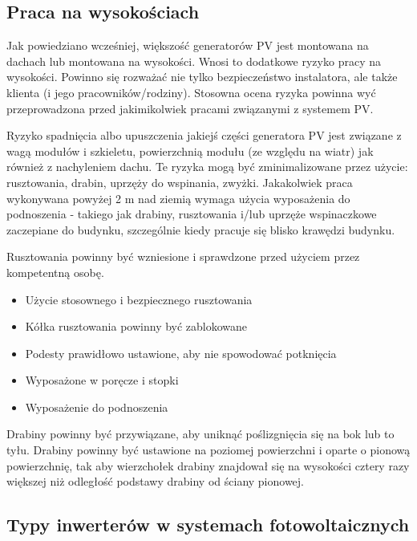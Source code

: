 \documentclass[12pt,a4paper]{article}
\begin{document}
 

\subsection{Praca na wysokościach }


Jak powiedziano wcześniej, większość generatorów PV jest montowana na 
dachach lub montowana na wysokości. Wnosi to dodatkowe ryzyko pracy na 
wysokości. Powinno się rozważać nie tylko bezpieczeństwo instalatora, 
ale także klienta (i jego pracowników/rodziny). Stosowna ocena ryzyka 
powinna wyć przeprowadzona przed jakimikolwiek pracami związanymi z 
systemem PV. 

 

Ryzyko spadnięcia albo upuszczenia jakiejś części generatora PV jest 
związane z wagą modułów i szkieletu, powierzchnią modułu (ze względu na 
wiatr) jak również z nachyleniem dachu. Te ryzyka mogą być 
zminimalizowane przez użycie: rusztowania, drabin, uprzęży do wspinania, 
zwyżki. Jakakolwiek praca wykonywana powyżej 2 m nad ziemią wymaga 
użycia wyposażenia do podnoszenia - takiego jak drabiny, rusztowania 
i/lub uprzęże wspinaczkowe zaczepiane do budynku, szczególnie kiedy 
pracuje się blisko krawędzi budynku. 

 

Rusztowania powinny być wzniesione i sprawdzone przed użyciem przez 
kompetentną osobę. 

\begin{itemize}
\item Użycie stosownego i bezpiecznego rusztowania 
\item Kółka rusztowania powinny być zablokowane 
\item Podesty prawidłowo ustawione, aby nie spowodować potknięcia 
\item Wyposażone w poręcze i stopki 
\item Wyposażenie do podnoszenia 
\end{itemize}
Drabiny powinny być przywiązane, aby uniknąć poślizgnięcia się na bok 
lub to tyłu. Drabiny powinny być ustawione na poziomej powierzchni i 
oparte o pionową powierzchnię, tak aby wierzchołek drabiny znajdował się 
na wysokości cztery razy większej niż odległość podstawy drabiny od 
ściany pionowej. 

 

\subsection{Typy inwerterów w systemach fotowoltaicznych}
\end{document}
